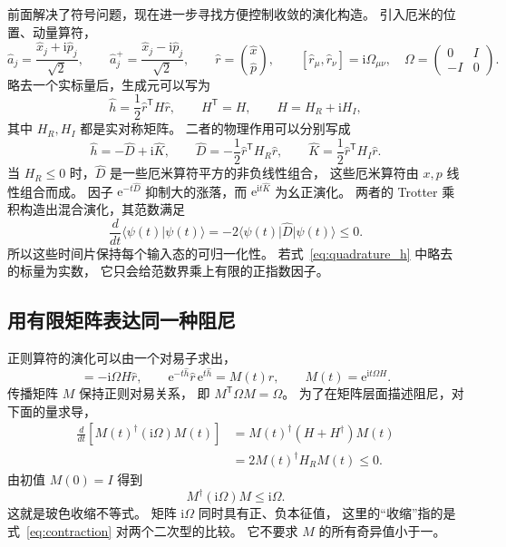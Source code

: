 \documentclass[UTF8,11pt,a4paper,fontset=fandol]{ctexart}
\newcommand{\ee}{\mathrm e}
\newcommand{\ii}{\mathrm i}
\newcommand{\trans}{\mathsf T}
\numberwithin{equation}{section}
\begin{document}
前面解决了符号问题，现在进一步寻找方便控制收敛的演化构造。
引入厄米的位置、动量算符，
\begin{equation}
 \hat a_j=\frac{\hat x_j+\ii\hat p_j}{\sqrt2},\qquad
 \hat a_j^+=\frac{\hat x_j-\ii\hat p_j}{\sqrt2},\qquad
 \hat r=\binom{\hat x}{\hat p},\qquad
 [\hat r_\mu,\hat r_\nu]=\ii\Omega_{\mu\nu},\quad
 \Omega=\begin{pmatrix}0&I\\-I&0\end{pmatrix}.
 \label{eq:quadratures}
\end{equation}
略去一个实标量后，生成元可以写为
\begin{equation}
 \hat h=\frac12\hat r^\trans H\hat r,\qquad
 H^\trans=H,\qquad H=H_R+\ii H_I,
 \label{eq:quadrature_h}
\end{equation}
其中 $H_R,H_I$ 都是实对称矩阵。
二者的物理作用可以分别写成
\begin{equation}
 \hat h=-\hat D+\ii\hat K,\qquad
 \hat D=-\frac12\hat r^\trans H_R\hat r,\qquad
 \hat K=\frac12\hat r^\trans H_I\hat r.
 \label{eq:damping_unitary}
\end{equation}
当 $H_R\leq0$ 时，$\hat D$ 是一些厄米算符平方的非负线性组合，
这些厄米算符由 $x,p$ 线性组合而成。
因子 $\ee^{-t\hat D}$ 抑制大的涨落，而 $\ee^{\ii t\hat K}$ 为幺正演化。
两者的 Trotter 乘积构造出混合演化，其范数满足
\begin{equation}
 \frac{d}{dt}\langle\psi(t)|\psi(t)\rangle
 =-2\langle\psi(t)|\hat D|\psi(t)\rangle\leq0.
 \label{eq:norm_damping}
\end{equation}
所以这些时间片保持每个输入态的可归一化性。
若式~\eqref{eq:quadrature_h} 中略去的标量为实数，
它只会给范数界乘上有限的正指数因子。

\subsection{用有限矩阵表达同一种阻尼}

正则算符的演化可以由一个对易子求出，
\begin{equation}
 [\hat h,\hat r]=-\ii\Omega H\hat r,
 \qquad
 \ee^{-t\hat h}\hat r\,\ee^{t\hat h}=M(t)\hat r,
 \qquad M(t)=\ee^{\ii t\Omega H}.
 \label{eq:propagation}
\end{equation}
传播矩阵 $M$ 保持正则对易关系，
即 $M^\trans\Omega M=\Omega$。
为了在矩阵层面描述阻尼，对下面的量求导，
\begin{align}
 \frac{d}{dt}\left[M(t)^\dagger(\ii\Omega)M(t)\right]
 &=M(t)^\dagger(H+H^\dagger)M(t)\nonumber\\
 &=2M(t)^\dagger H_R M(t)\leq0.
 \label{eq:derivative_contraction}
\end{align}
由初值 $M(0)=I$ 得到
\begin{equation}
 \boxed{M^\dagger(\ii\Omega)M\leq\ii\Omega.}
 \label{eq:contraction}
\end{equation}
这就是玻色收缩不等式。
矩阵 $\ii\Omega$ 同时具有正、负本征值，
这里的“收缩”指的是式~\eqref{eq:contraction} 对两个二次型的比较。
它不要求 $M$ 的所有奇异值小于一。
\end{document}
